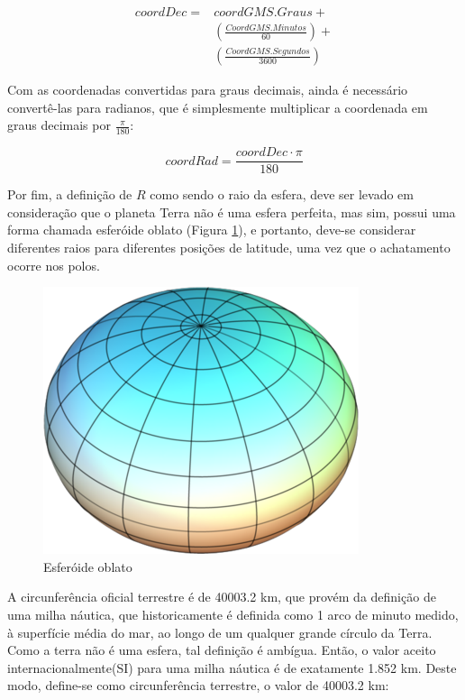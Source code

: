 \[
\begin{matrix}
coordDec = 
& coordGMS.Graus +\\ 
& \left(\frac{CoordGMS.Minutos}{60}\right) +\\ 
& \left(\frac{CoordGMS.Segundos}{3600}\right)
\end{matrix}
\]

Com as coordenadas convertidas para graus decimais, ainda é necessário convertê-las para radianos, que é simplesmente multiplicar a coordenada em graus decimais por \(\frac{\pi}{180}\):

\[coordRad = \frac{coordDec \cdot \pi}{180}\]

Por fim, a definição de \(R\) como sendo o raio da esfera, deve ser levado em consideração que o planeta Terra não é uma esfera perfeita, mas sim, possui uma forma chamada esferóide oblato (Figura \ref{fig:OblateSpheroid}), e portanto, deve-se considerar diferentes raios para diferentes posições de latitude, uma vez que o achatamento ocorre nos polos.  

\begin{figure}[h]
	\centering	
	\includegraphics[scale=0.3]{Figuras/OblateSpheroid.PNG}
	\caption{Esferóide oblato}
	\label{fig:OblateSpheroid}
\end{figure}

A circunferência oficial terrestre é de 40003.2 km, que provém da definição de uma milha náutica, que historicamente é definida como 1 arco de minuto medido, à superfície média do mar, ao longo de um qualquer grande círculo da Terra. Como a terra não é uma esfera, tal definição é ambígua. Então, o valor aceito internacionalmente(SI) para uma milha náutica é de exatamente 1.852 km. Deste modo, define-se como circunferência terrestre, o valor de 40003.2 km:

